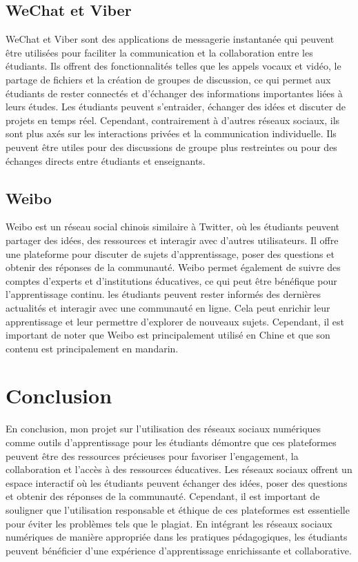 \documentclass[12pt,a4paper,titlepage]{article}
\begin{document}
\subsection{WeChat et Viber}
WeChat et Viber sont des applications de messagerie instantanée qui peuvent être utilisées pour faciliter la communication et la collaboration entre les étudiants. Ils offrent des fonctionnalités telles que les appels vocaux et vidéo, le partage de fichiers et la création de groupes de discussion, ce qui permet aux étudiants de rester connectés et d'échanger des informations importantes liées à leurs études. Les étudiants peuvent s'entraider, échanger des idées et discuter de projets en temps réel. Cependant, contrairement à d'autres réseaux sociaux, ils sont plus axés sur les interactions privées et la communication individuelle. Ils peuvent être utiles pour des discussions de groupe plus restreintes ou pour des échanges directs entre étudiants et enseignants.
\subsection{Weibo}
Weibo est un réseau social chinois similaire à Twitter, où les étudiants peuvent partager des idées, des ressources et interagir avec d'autres utilisateurs. Il offre une plateforme pour discuter de sujets d'apprentissage, poser des questions et obtenir des réponses de la communauté. Weibo permet également de suivre des comptes d'experts et d'institutions éducatives, ce qui peut être bénéfique pour l'apprentissage continu. les étudiants peuvent rester informés des dernières actualités et interagir avec une communauté en ligne. Cela peut enrichir leur apprentissage et leur permettre d'explorer de nouveaux sujets. Cependant, il est important de noter que Weibo est principalement utilisé en Chine et que son contenu est principalement en mandarin.
\section{Conclusion }
En conclusion, mon projet sur l'utilisation des réseaux sociaux numériques comme outils d'apprentissage pour les étudiants démontre que ces plateformes peuvent être des ressources précieuses pour favoriser l'engagement, la collaboration et l'accès à des ressources éducatives. Les réseaux sociaux offrent un espace interactif où les étudiants peuvent échanger des idées, poser des questions et obtenir des réponses de la communauté. Cependant, il est important de souligner que l'utilisation responsable et éthique de ces plateformes est essentielle pour éviter les problèmes tels que le plagiat. En intégrant les réseaux sociaux numériques de manière appropriée dans les pratiques pédagogiques, les étudiants peuvent bénéficier d'une expérience d'apprentissage enrichissante et collaborative. 
\end{document}
